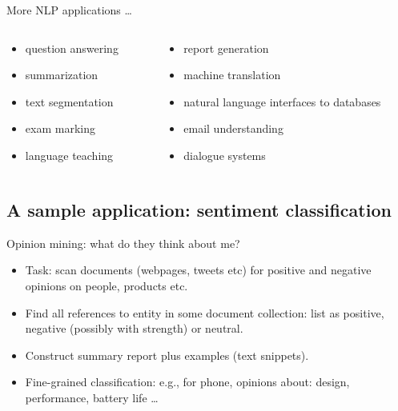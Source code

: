 \documentclass[compress]{beamer}
\begin{document}
\begin{frame}{More NLP applications \ldots} 
  \begin{columns}
    \begin{column}{.5\textwidth}
      \begin{itemize}
      \item question answering
      \item summarization
      \item text segmentation
      \item exam marking
      \item language teaching
      \end{itemize}
    \end{column}

    \begin{column}{.5\textwidth}
      \begin{itemize}
      \item report generation
      \item machine translation
      \item natural language interfaces to databases
      \item email understanding
      \item dialogue systems
      \end{itemize}
    \end{column}
  \end{columns}
\end{frame}

\subsection{A sample application: sentiment classification}

\begin{frame}{Opinion mining: what do they think about me?}
  \begin{itemize}
  \item Task: scan documents (webpages, tweets etc) for positive and
    negative opinions on people, products etc.
  \item Find all references to entity in some document collection:
    list as positive, negative (possibly with strength) or neutral.
  \item Construct summary report plus examples (text snippets).
  \item Fine-grained classification: e.g., for phone, opinions about:
    design, performance, battery life \ldots
\end{itemize}
\end{frame}
\end{document}
